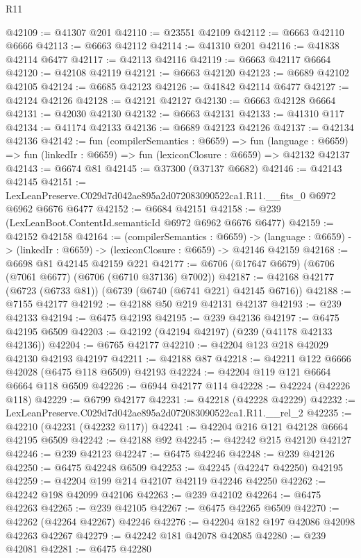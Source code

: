 \begin{lexlean}{R11}
\begin{coremodule}
@42109 := @41307 @201
@42110 := @23551 @42109
@42112 := @6663 @42110 @6666
@42113 := @6663 @42112
@42114 := @41310 @201
@42116 := @41838 @42114 @6477
@42117 := @42113 @42116
@42119 := @6663 @42117 @6664
@42120 := @42108 @42119
@42121 := @6663 @42120
@42123 := @6689 @42102 @42105
@42124 := @6685 @42123
@42126 := @41842 @42114 @6477
@42127 := @42124 @42126
@42128 := @42121 @42127
@42130 := @6663 @42128 @6664
@42131 := @42030 @42130
@42132 := @6663 @42131
@42133 := @41310 @117
@42134 := @41174 @42133
@42136 := @6689 @42123 @42126
@42137 := @42134 @42136
@42142 := fun (compilerSemantics : @6659) =>
  fun (language : @6659) => fun (linkedIr : @6659) => fun (lexiconClosure : @6659) => @42132 @42137
@42143 := @6674 @81
@42145 := @37300 (@37137 @6682)
@42146 := @42143 @42145
@42151 := LexLeanPreserve.C029d7d042ae895a2d072083090522ca1.R11.__fits_0 @6972 @6962 @6676 @6477
@42152 := @6684 @42151
@42158 := @239 (LexLeanBoot.ContentId.semanticId @6972 @6962 @6676 @6477)
@42159 := @42152 @42158
@42164 := (compilerSemantics : @6659) ->
  (language : @6659) -> (linkedIr : @6659) -> (lexiconClosure : @6659) -> @42146 @42159
@42168 := @6698 @81 @42145 @42159 @221
@42177 := @6706 (@17647 @6679) (@6706 (@7061 @6677) (@6706 (@6710 @37136) @7002))
@42187 := @42168 @42177 (@6723 (@6733 @81)) (@6739 (@6740 (@6741 @221) @42145 @6716))
@42188 := @7155 @42177
@42192 := @42188 @50 @219 @42131 @42137
@42193 := @239 @42133
@42194 := @6475 @42193
@42195 := @239 @42136
@42197 := @6475 @42195 @6509
@42203 := @42192 (@42194 @42197) (@239 (@41178 @42133 @42136))
@42204 := @6765 @42177
@42210 := @42204 @123 @218 @42029 @42130 @42193 @42197
@42211 := @42188 @87
@42218 := @42211 @122 @6666 @42028 (@6475 @118 @6509) @42193
@42224 := @42204 @119 @121 @6664 @6664 @118 @6509
@42226 := @6944 @42177 @114
@42228 := @42224 (@42226 @118)
@42229 := @6799 @42177
@42231 := @42218 (@42228 @42229)
@42232 := LexLeanPreserve.C029d7d042ae895a2d072083090522ca1.R11.__rel_2
@42235 := @42210 (@42231 (@42232 @117))
@42241 := @42204 @216 @121 @42128 @6664 @42195 @6509
@42242 := @42188 @92
@42245 := @42242 @215 @42120 @42127
@42246 := @239 @42123
@42247 := @6475 @42246
@42248 := @239 @42126
@42250 := @6475 @42248 @6509
@42253 := @42245 (@42247 @42250) @42195
@42259 := @42204 @199 @214 @42107 @42119 @42246 @42250
@42262 := @42242 @198 @42099 @42106
@42263 := @239 @42102
@42264 := @6475 @42263
@42265 := @239 @42105
@42267 := @6475 @42265 @6509
@42270 := @42262 (@42264 @42267) @42246
@42276 := @42204 @182 @197 @42086 @42098 @42263 @42267
@42279 := @42242 @181 @42078 @42085
@42280 := @239 @42081
@42281 := @6475 @42280

\end{coremodule}
\end{lexlean}
